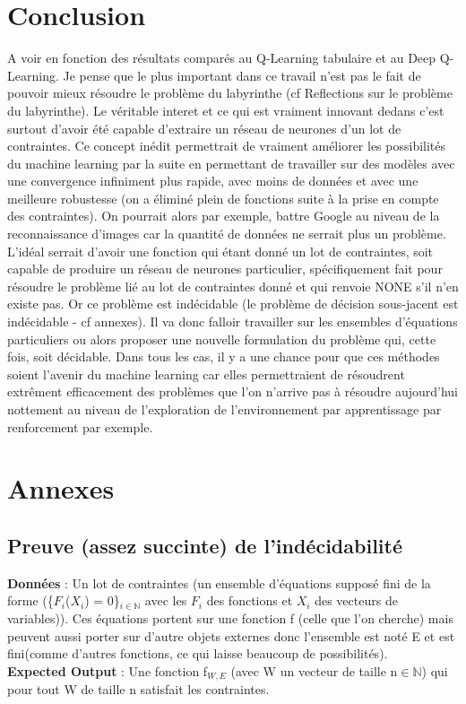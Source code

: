 \documentclass[12pt]{article}
\begin{document}
\section{Conclusion}
A voir en fonction des résultats comparés au Q-Learning tabulaire et au Deep Q-Learning.
Je pense que le plus important dans ce travail n'est pas le fait de pouvoir mieux résoudre le problème du labyrinthe (cf Reflections sur le problème du labyrinthe). Le véritable interet et ce qui est vraiment innovant dedans c'est surtout d'avoir été capable d'extraire un réseau de neurones d'un lot de contraintes. Ce concept inédit permettrait de vraiment améliorer les possibilités du machine learning par la suite en permettant de travailler sur des modèles avec une convergence infiniment plus rapide, avec moins de données et avec une meilleure robustesse (on a éliminé plein de fonctions suite à la prise en compte des contraintes). On pourrait alors par exemple, battre Google au niveau de la reconnaissance d'images car la quantité de données ne serrait plus un problème. L'idéal serrait d'avoir une fonction qui étant donné un lot de contraintes, soit capable de produire un réseau de neurones particulier, spécifiquement fait pour résoudre le problème lié au lot de contraintes donné et qui renvoie NONE s'il n'en existe pas. Or ce problème est indécidable (le problème de décision sous-jacent est indécidable - cf annexes). Il va donc falloir travailler sur les ensembles d'équations particuliers ou alors proposer une nouvelle formulation du problème qui, cette fois, soit décidable. Dans tous les cas, il y a une chance pour que ces méthodes soient l'avenir du machine learning car elles permettraient de résoudrent extrêment efficacement des problèmes que l'on n'arrive pas à résoudre aujourd'hui nottement au niveau de l'exploration de l'environnement par apprentissage par renforcement par exemple.

\section{Annexes}
\subsection{Preuve (assez succinte) de l'indécidabilité}
\textbf{Données} : Un lot de contraintes (un ensemble d'équations supposé fini de la forme (\{$F_i$($X_i$) = 0\}$_{i\in\mathbb{N}}$ avec les $F_i$ des fonctions et $X_i$ des vecteurs de variables)). Ces équations portent sur une fonction f (celle que l'on cherche) mais peuvent aussi porter sur d'autre objets externes donc l'ensemble est noté E et est fini(comme d'autres fonctions, ce qui laisse beaucoup de possibilités).\\
\textbf{Expected Output} : Une fonction f$_{W,E}$ (avec W un vecteur de taille n$\in\mathbb{N}$) qui pour tout W de taille n
satisfait les contraintes.\\
\end{document}
